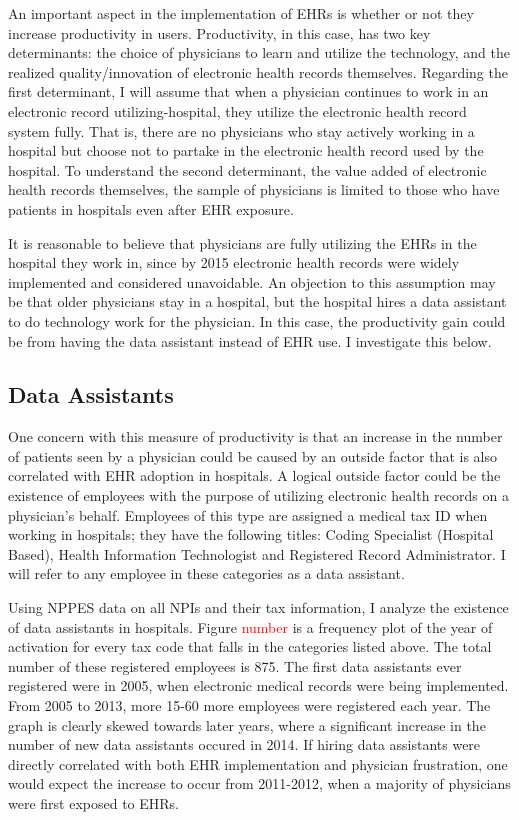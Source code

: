 \documentclass[11pt]{article}
\begin{document}
An important aspect in the implementation of EHRs is whether or not they increase productivity in users. Productivity, in this case, has two key determinants: the choice of physicians to learn and utilize the technology, and the realized quality/innovation of electronic health records themselves. Regarding the first determinant, I will assume that when a physician continues to work in an electronic record utilizing-hospital, they utilize the electronic health record system fully. That is, there are no physicians who stay actively working in a hospital but choose not to partake in the electronic health record used by the hospital. To understand the second determinant, the value added of electronic health records themselves, the sample of physicians is limited to those who have patients in hospitals even after EHR exposure. 

It is reasonable to believe that physicians are fully utilizing the EHRs in the hospital they work in, since by 2015 electronic health records were widely implemented and considered unavoidable. An objection to this assumption may be that older physicians stay in a hospital, but the hospital hires a data assistant to do technology work for the physician. In this case, the productivity gain could be from having the data assistant instead of EHR use. I investigate this below.

\subsection{Data Assistants}

One concern with this measure of productivity is that an increase in the number of patients seen by a physician could be caused by an outside factor that is also correlated with EHR adoption in hospitals. A logical outside factor could be the existence of employees with the purpose of utilizing electronic health records on a physician's behalf. Employees of this type are assigned a medical tax ID when working in hospitals; they have the following titles: Coding Specialist (Hospital Based), Health Information Technologist and Registered Record Administrator. I will refer to any employee in these categories as a data assistant. 

Using NPPES data on all NPIs and their tax information, I analyze the existence of data assistants in hospitals. Figure \textcolor{red}{number} is a frequency plot of the year of activation for every tax code that falls in the categories listed above. The total number of these registered employees is 875. The first data assistants ever registered were in 2005, when electronic medical records were being implemented. From 2005 to 2013, more 15-60 more employees were registered each year. The graph is clearly skewed towards later years, where a significant increase in the number of new data assistants occured in 2014. If hiring data assistants were directly correlated with both EHR implementation and physician frustration, one would expect the increase to occur from 2011-2012, when a majority of physicians were first exposed to EHRs. 
\end{document}
